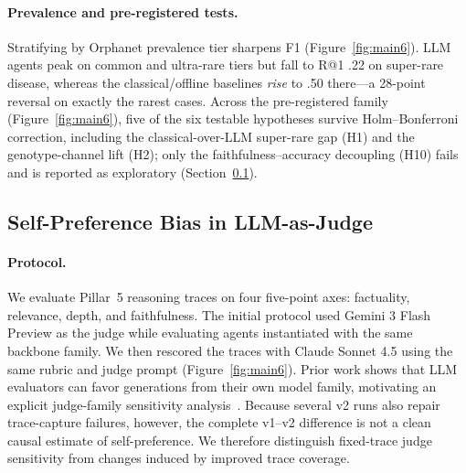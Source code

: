\documentclass[letterpaper]{article} %
\begin{document}
\paragraph{Prevalence and pre-registered tests.}
Stratifying by Orphanet prevalence tier sharpens F1 (Figure~\ref{fig:main6}). LLM agents peak on common and ultra-rare tiers but fall to R@1 .22 on super-rare disease, whereas the classical/offline baselines \emph{rise} to .50 there---a 28-point reversal on exactly the rarest cases. Across the pre-registered family (Figure~\ref{fig:main6}), five of the six testable hypotheses survive Holm--Bonferroni correction, including the classical-over-LLM super-rare gap (H1) and the genotype-channel lift (H2); only the faithfulness--accuracy decoupling (H10) fails and is reported as exploratory (Section~\ref{sec-7-5}).



\subsection{Self-Preference Bias in LLM-as-Judge}
\label{sec-7-5}

\paragraph{Protocol.}
We evaluate Pillar~5 reasoning traces on four five-point axes: factuality, relevance, depth, and faithfulness. The initial protocol used Gemini 3 Flash Preview as the judge while evaluating agents instantiated with the same backbone family. We then rescored the traces with Claude Sonnet 4.5 using the same rubric and judge prompt (Figure~\ref{fig:main6}). Prior work shows that LLM evaluators can favor generations from their own model family, motivating an explicit judge-family sensitivity analysis~\cite{panickssery2024selfpreference}. Because several v2 runs also repair trace-capture failures, however, the complete v1--v2 difference is not a clean causal estimate of self-preference. We therefore distinguish fixed-trace judge sensitivity from changes induced by improved trace coverage.
\end{document}

